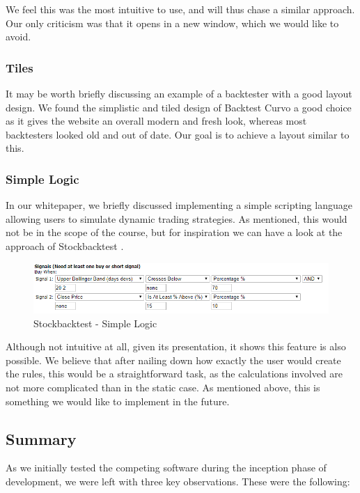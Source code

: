 \documentclass[main.tex]{subfiles}
\begin{document}
We feel this was the most intuitive to use, and will thus chase a similar approach. Our only criticism was that it opens in a new window, which we would like to avoid. 

\subsubsection*{Tiles}

It may be worth briefly discussing an example of a backtester with a good layout design. We found the simplistic and tiled design of Backtest Curvo \cite{backtestcurvo} a good choice as it gives the website an overall modern and fresh look, whereas most backtesters looked old and out of date. Our goal is to achieve a layout similar to this. 

\subsubsection*{Simple Logic}

In our whitepaper, we briefly discussed implementing a simple scripting language allowing users to simulate dynamic trading strategies. As mentioned, this would not be in the scope of the course, but for inspiration we can have a look at the approach of Stockbacktest \cite{stockbacktest}. 

\begin{figure}[H]
   \centering
   \includegraphics[scale=0.7]{02Background/02Pictures/stockbacktest.png}
   \caption{Stockbacktest - Simple Logic}
\end{figure}

Although not intuitive at all, given its presentation, it shows this feature is also possible. We believe that after nailing down how exactly the user would create the rules, this would be a straightforward task, as the calculations involved are not more complicated than in the static case. As mentioned above, this is something we would like to implement in the future.

\subsection{Summary}

As we initially tested the competing software during the inception phase of development, we were left with three key observations. These were the following:
\end{document}

